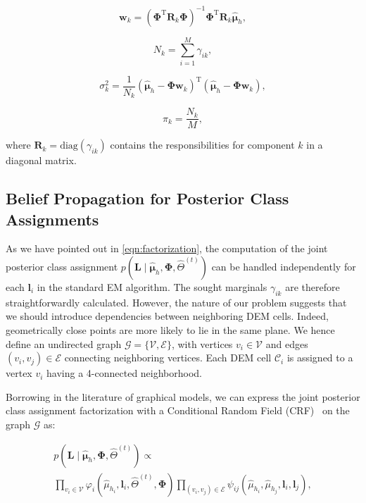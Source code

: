 \begin{equation}
\label{eqn:coeff}
\mathbf{w}_k = (\boldsymbol{\Phi}^\text{T}\mathbf{R}_k\boldsymbol{\Phi})^{-1}
\boldsymbol{\Phi}^\text{T}\mathbf{R}_k\hat{\boldsymbol\mu}_h,
\end{equation}

\begin{equation}
\label{eqn:numpoints}
N_k = \sum_{i=1}^M\gamma_{ik},
\end{equation}

\begin{equation}
\label{eqn:var}
\sigma^2_k = \frac{1}{N_k}(\hat{\boldsymbol\mu}_h-\boldsymbol{\Phi}
\mathbf{w}_k)^\text{T}(\hat{\boldsymbol\mu}_h-\boldsymbol{\Phi}\mathbf{w}_k),
\end{equation}

\begin{equation}
\label{eqn:weights}
\pi_k = \frac{N_k}{M},
\end{equation}

where $\mathbf{R}_k=\text{diag}(\gamma_{ik})$ contains the responsibilities for
component $k$ in a diagonal matrix.

\subsection{Belief Propagation for Posterior Class Assignments}

As we have pointed out in \eqref{eqn:factorization}, the computation of the
joint posterior class assignment
$p(\mathbf{L}\mid\hat{\boldsymbol\mu}_h,\boldsymbol{\Phi},\hat{\Theta}^{(t)})$
can be handled independently for each $\mathbf{l}_i$ in the standard EM
algorithm. The sought marginals $\gamma_{ik}$ are therefore straightforwardly
calculated. However, the nature of our problem suggests that we should introduce
dependencies between neighboring DEM cells. Indeed, geometrically close points
are more likely to lie in the same plane. We hence define an undirected graph
$\mathcal{G}=\{\mathcal{V},\mathcal{E}\}$, with vertices $v_i\in\mathcal{V}$ and
edges $(v_i,v_j)\in\mathcal{E}$ connecting neighboring vertices. Each DEM cell
$\mathcal{C}_i$ is assigned to a vertex $v_i$ having a 4-connected neighborhood.

Borrowing in the literature of graphical models, we can express the joint
posterior class assignment factorization with a Conditional Random Field
(CRF)~\cite{lafferty01conditional} on the graph $\mathcal{G}$ as:

\begin{eqnarray}
\label{eqn:crf_joint}
p(\mathbf{L}\mid\hat{\boldsymbol\mu}_h,\boldsymbol{\Phi},\hat{\Theta}^{(t)})
\propto
\phantom{aaaaaaaaaaaaaaaaaaaaaaaaaaaa}\\ \nonumber
\prod_{v_i\in\mathcal{V}}
\varphi_i(\hat{\mu}_{h_i},\mathbf{l}_i,\hat{\Theta}^{(t)},\boldsymbol{\Phi})
\prod_{(v_i,v_j)\in\mathcal{E}}\psi_{ij}(\hat{\mu}_{h_i},\hat{\mu}_{h_j},
\mathbf{l}_i,\mathbf{l}_j),
\end{eqnarray}

